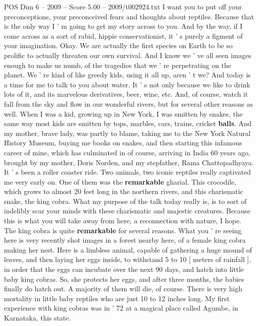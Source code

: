 \begin{textsample}{POS Dim 6 – 2009 – Score 5.00 – 2009/t002924.txt}  \label{ex:f6_pos_029}
I want you to put off your preconceptions, your preconceived fears and thoughts about reptiles.
Because that is the only way I ' m going to get my story across to you.
And by the way, if I come across as a sort of rabid, hippie conservationist, it ' s purely a figment of your imagination.
Okay.
We are actually the first species on Earth to be so prolific to actually threaten our own survival.
And I know we ' ve all seen images enough to make us numb, of the tragedies that we ' re perpetrating on the planet.
We ' re kind of like greedy kids, using it all up, aren ' t we?
And today is a time for me to talk to you about water.
It ' s not only because we like to drink lots of it, and its marvelous derivatives, beer, wine, etc.
And, of course, watch it fall from the sky and flow in our wonderful rivers, but for several other reasons as well.
When I was a kid, growing up in New York, I was smitten by snakes, the same way most kids are smitten by tops, marbles, cars, trains, cricket \textbf{balls}.
And my mother, brave lady, was partly to blame, taking me to the New York Natural History Museum, buying me books on snakes, and then starting this infamous career of mine, which has culminated in of course, arriving in India 60 years ago, brought by my mother, Doris Norden, and my stepfather, Rama Chattopadhyaya.
It ' s been a roller coaster ride.
Two animals, two iconic reptiles really captivated me very early on.
One of them was the \textbf{remarkable} gharial.
This crocodile, which grows to almost 20 feet long in the northern rivers, and this charismatic snake, the king cobra.
What my purpose of the talk today really is, is to sort of indelibly scar your minds with these charismatic and majestic creatures.
Because this is what you will take away from here, a reconnection with nature, I hope.
The king cobra is quite \textbf{remarkable} for several reasons.
What you ' re seeing here is very recently shot images in a forest nearby here, of a female king cobra making her nest.
Here is a limbless animal, capable of gathering a huge mound of leaves, and then laying her eggs inside, to withstand 5 to 10 [ meters of rainfall ], in order that the eggs can incubate over the next 90 days, and hatch into little baby king cobras.
So, she protects her eggs, and after three months, the babies finally do hatch out.
A majority of them will die, of course.
There is very high mortality in little baby reptiles who are just 10 to 12 inches long.
My first experience with king cobras was in ' 72 at a magical place called Agumbe, in Karnataka, this state.

\end{textsample}
